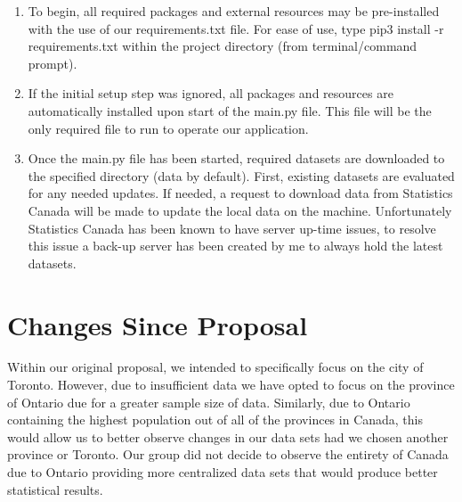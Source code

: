 \documentclass[fontsize=11pt]{article}
\begin{document}
    \begin{enumerate}
        \item To begin, all required packages and external resources may be pre-installed with the use of our requirements.txt file. For ease of use, type pip3 install -r requirements.txt within the project directory (from terminal/command prompt).

        \item If the initial setup step was ignored, all packages and resources are automatically installed upon start of the main.py file. This file will be the only required file to run to operate our application.

        \item Once the main.py file has been started, required datasets are downloaded to the specified directory (data by default). First, existing datasets are evaluated for any needed updates. If needed, a request to download data from Statistics Canada will be made to update the local data on the machine. Unfortunately Statistics Canada has been known to have server up-time issues, to resolve this issue a back-up server has been created by me to always hold the latest datasets.
    \end{enumerate}

    \section*{Changes Since Proposal}

    Within our original proposal, we intended to specifically focus on the city of Toronto. However, due to insufficient data we have opted to focus on the province of Ontario due for a greater sample size of data. Similarly, due to Ontario containing the highest population out of all of the provinces in Canada, this would allow us to better observe changes in our data sets had we chosen another province or Toronto. Our group did not decide to observe the entirety of Canada due to Ontario providing more centralized data sets that would produce better statistical results.
\end{document}
